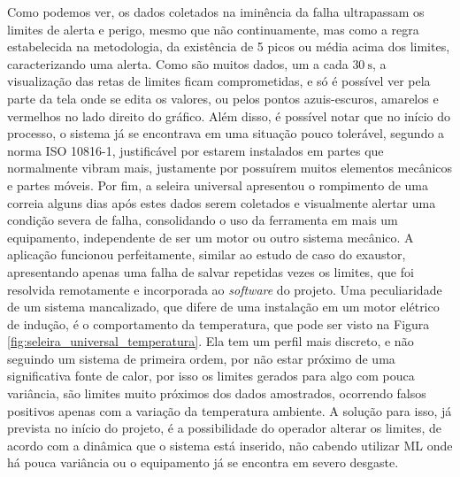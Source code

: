 Como podemos ver, os dados coletados na iminência da falha ultrapassam os limites de alerta e perigo, mesmo que não continuamente, mas
como a regra estabelecida na metodologia, da existência de 5 picos ou média acima dos limites, caracterizando uma alerta. Como são muitos dados,
um a cada $\SI{30}{\second}$, a visualização das retas de limites ficam comprometidas, e só é possível ver pela parte da tela onde se edita os
valores, ou pelos pontos azuis-escuros, amarelos e vermelhos no lado direito do gráfico. Além disso, é possível notar que no início do processo,
o sistema já se encontrava em uma situação pouco tolerável, segundo a norma ISO 10816-1, justificável por estarem instalados em partes que 
normalmente vibram mais, justamente por possuírem muitos elementos mecânicos e partes móveis. Por fim, a seleira universal apresentou o rompimento de uma
correia alguns dias após estes dados serem coletados e visualmente alertar uma condição severa de falha, consolidando o uso da ferramenta em
mais um equipamento, independente de ser um motor ou outro sistema mecânico. A aplicação funcionou perfeitamente, similar ao estudo de caso do
exaustor, apresentando apenas uma falha de salvar repetidas vezes os limites, que foi resolvida remotamente e incorporada ao \textit{software} do projeto.
Uma peculiaridade de um sistema mancalizado, que difere de uma instalação em um motor elétrico de indução, é o comportamento da temperatura,
que pode ser visto na Figura \ref{fig:seleira_universal_temperatura}. 
Ela tem um perfil mais discreto, e não seguindo um sistema de primeira ordem, por não estar próximo de uma significativa fonte de calor, por isso
os limites gerados para algo com pouca variância, são limites muito próximos dos dados amostrados, ocorrendo falsos positivos apenas com a
variação da temperatura ambiente. A solução para isso, já prevista no início do projeto, é a possibilidade do operador alterar os limites, de 
acordo com a dinâmica que o sistema está inserido, não cabendo utilizar  ML onde há pouca variância ou o equipamento já se 
encontra em severo desgaste. 


